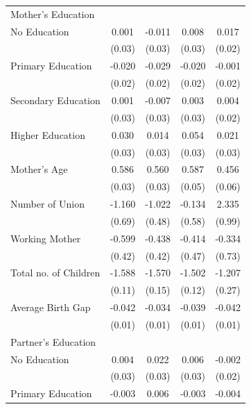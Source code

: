 \begin{longtable}{l*{4}{c}}
\multicolumn{5}{l}{Mother's Education} \\
\hspace{1em}No Education & 0.001 & -0.011 & 0.008 & 0.017 \\
                    & (0.03) & (0.03) & (0.03) & (0.02) \\
\hspace{1em}Primary Education & -0.020 & -0.029 & -0.020 & -0.001 \\
                    & (0.02) & (0.02) & (0.02) & (0.02) \\
\hspace{1em}Secondary Education & 0.001 & -0.007 & 0.003 & 0.004 \\
                    & (0.03) & (0.03) & (0.03) & (0.02) \\
\hspace{1em}Higher Education & 0.030 & 0.014 & 0.054\sym{*} & 0.021 \\
                    & (0.03) & (0.03) & (0.03) & (0.03) \\
Mother's Age & 0.586\sym{***} & 0.560\sym{***} & 0.587\sym{***} & 0.456\sym{***} \\
                    & (0.03) & (0.03) & (0.05) & (0.06) \\
Number of Union & -1.160\sym{*} & -1.022\sym{**} & -0.134 & 2.335\sym{**} \\
                    & (0.69) & (0.48) & (0.58) & (0.99) \\
Working Mother & -0.599 & -0.438 & -0.414 & -0.334 \\
                    & (0.42) & (0.42) & (0.47) & (0.73) \\
Total no. of Children & -1.588\sym{***} & -1.570\sym{***} & -1.502\sym{***} & -1.207\sym{***} \\
                    & (0.11) & (0.15) & (0.12) & (0.27) \\
Average Birth Gap & -0.042\sym{***} & -0.034\sym{***} & -0.039\sym{***} & -0.042\sym{***} \\
                    & (0.01) & (0.01) & (0.01) & (0.01) \\
\multicolumn{5}{l}{Partner's Education} \\
\hspace{1em}No Education & 0.004 & 0.022 & 0.006 & -0.002 \\
                    & (0.03) & (0.03) & (0.03) & (0.02) \\
\hspace{1em}Primary Education & -0.003 & 0.006 & -0.003 & -0.004 \\

\end{longtable}
